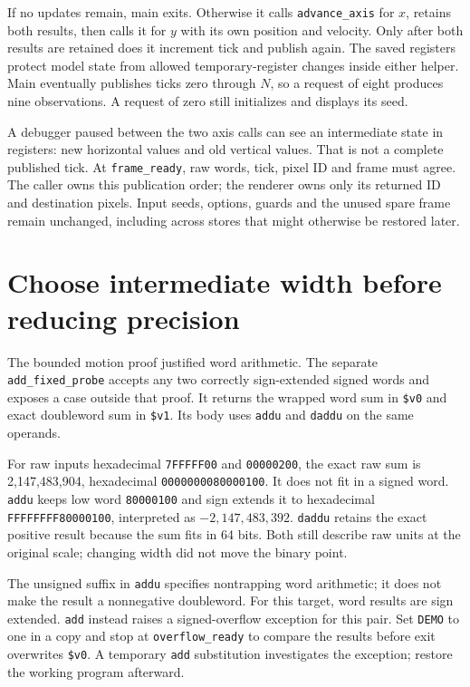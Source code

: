 If no updates remain, main exits. Otherwise it calls \texttt{advance\_axis} for
$x$, retains both results, then calls it for $y$ with its own position and velocity.
Only after both results are retained does it increment tick and publish again.
The saved registers protect model state from allowed temporary-register changes
inside either helper. Main eventually publishes ticks zero through $N$, so a
request of eight produces nine observations. A request of zero still initializes
and displays its seed.

A debugger paused between the two axis calls can see an intermediate state in
registers: new horizontal values and old vertical values. That is not a complete
published tick. At \texttt{frame\_ready}, raw words, tick, pixel ID and frame must
agree. The caller owns this publication order; the renderer owns only its returned
ID and destination pixels. Input seeds, options, guards and the unused spare frame
remain unchanged, including across stores that might otherwise be restored later.

\section{Choose intermediate width before reducing precision}

The bounded motion proof justified word arithmetic. The separate
\texttt{add\_fixed\_probe} accepts any two correctly sign-extended signed words
and exposes a case outside that proof. It returns the wrapped word sum in
\texttt{\$v0} and exact doubleword sum in \texttt{\$v1}. Its body uses
\texttt{addu} and \texttt{daddu} on the same operands.

For raw inputs hexadecimal \texttt{7FFFFF00} and \texttt{00000200}, the exact
raw sum is 2,147,483,904, hexadecimal \texttt{0000000080000100}. It does not fit
in a signed word. \texttt{addu} keeps low word \texttt{80000100} and sign extends
it to hexadecimal \texttt{FFFFFFFF80000100}, interpreted as $-2{,}147{,}483{,}392$.
\texttt{daddu} retains the exact positive result because the sum fits in 64 bits.
Both still describe raw units at the original scale; changing width did not move
the binary point.

The unsigned suffix in \texttt{addu} specifies nontrapping word arithmetic; it
does not make the result a nonnegative doubleword. For this target, word results
are sign extended. \texttt{add} instead raises a signed-overflow exception for
this pair. Set \texttt{DEMO} to one in a copy and stop at
\texttt{overflow\_ready} to compare the results before exit overwrites
\texttt{\$v0}. A temporary \texttt{add} substitution investigates the exception;
restore the working program afterward.

